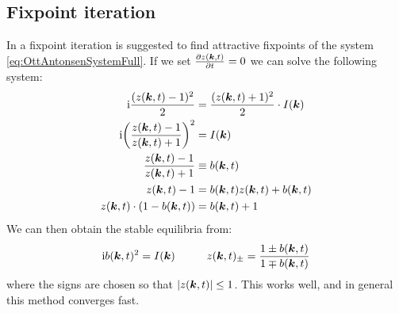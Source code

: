 \subsection{Fixpoint iteration}
In \cite{OttAntonsen2017} a fixpoint iteration is suggested to find attractive fixpoints of the system \eqref{eq:OttAntonsenSystemFull}. If we set $\frac{\partial z({\boldsymbol{k}}, t)}{\partial t} = 0$ we can solve the following system:
\begin{align}
\ic \frac{(z(\k, t)-1)^{2}}{2} &= \frac{(z(\k, t)+1)^{2}}{2} \cdot I(\k) \nonumber \\
\ic \left(\frac{z(\k, t)-1}{z(\k, t)+1}\right)^2 &= I(\k) \nonumber \\
\frac{z(\k, t)-1}{z(\k, t)+1} &\equiv b(\k,t) \nonumber \\
z(\k, t) - 1 &= b(\k,t) z(\k, t) + b(\k,t)  \nonumber \\
z(\k, t) \cdot (1 - b(\k,t)) &= b(\k,t)  + 1\nonumber
\end{align}
We can then obtain the stable equilibria from:
\begin{align}
\ic b(\k,t)^2 = I(\k) \hspace{10mm} z(\k, t)_{\pm} = \frac{1 \pm b(\k,t)}{1 \mp b(\k,t)} \label{eq:fixedpointiterations} 
\end{align}
where the signs are chosen so that $\vert z({\boldsymbol{k}}, t) \vert \leq 1$. This works well, and in general this method converges fast.



